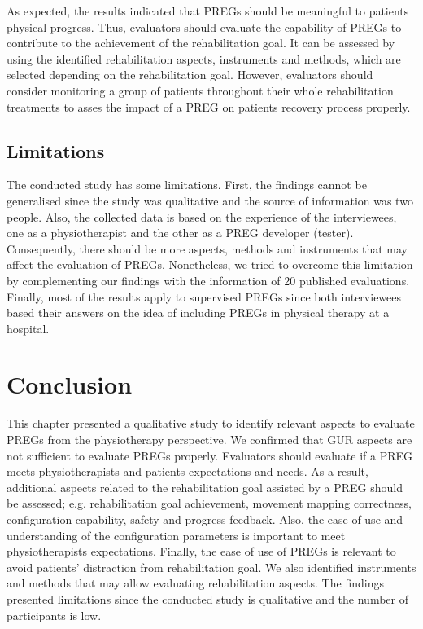As expected, the results indicated that \acp{PREG} should be meaningful to patients physical progress. Thus, evaluators should evaluate the capability of \acp{PREG} to contribute to the achievement of the rehabilitation goal. It can be assessed by using the identified rehabilitation aspects, instruments and methods, which are selected depending on the rehabilitation goal. However, evaluators should consider monitoring a group of patients throughout their whole rehabilitation treatments to asses the impact of a \ac{PREG} on patients recovery process properly.

\subsection{Limitations}
The conducted study has some limitations. First, the findings cannot be generalised since the study was qualitative and the source of information was two people. Also, the collected data is based on the experience of the interviewees, one as a physiotherapist and the other as a \ac{PREG} developer (tester). Consequently, there should be more aspects, methods and instruments that may affect the evaluation of \acp{PREG}. Nonetheless, we tried to overcome this limitation by complementing our findings with the information of 20 published evaluations. Finally, most of the results apply to supervised \acp{PREG} since both interviewees based their answers on the idea of including \acp{PREG} in physical therapy at a hospital.


\section{Conclusion}\label{sec:conclusion_aspects} %
This chapter presented a qualitative study to identify relevant aspects to evaluate \acp{PREG} from the physiotherapy perspective. We confirmed that \ac{GUR} aspects are not sufficient to evaluate \acp{PREG} properly. Evaluators should evaluate if a \ac{PREG} meets physiotherapists and patients expectations and needs. As a result, additional aspects related to the rehabilitation goal assisted by a \ac{PREG} should be assessed; e.g. rehabilitation goal achievement, movement mapping correctness, configuration capability, safety and progress feedback. Also, the ease of use and understanding of the configuration parameters is important to meet physiotherapists expectations. Finally, the ease of use of \acp{PREG} is relevant to avoid patients' distraction from rehabilitation goal. We also identified instruments and methods that may allow evaluating rehabilitation aspects. The findings presented limitations since the conducted study is qualitative and the number of participants is low.